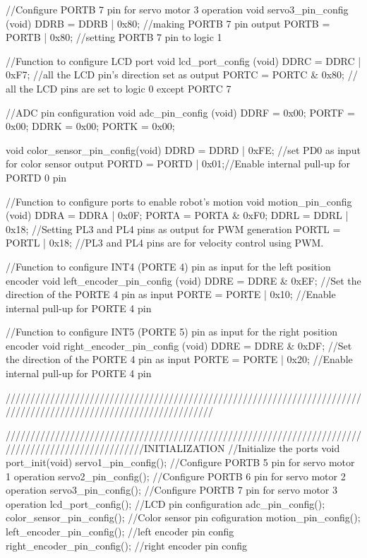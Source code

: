 //Configure PORTB 7 pin for servo motor 3 operation
void servo3_pin_config (void)
{
	DDRB  = DDRB | 0x80;  //making PORTB 7 pin output
	PORTB = PORTB | 0x80; //setting PORTB 7 pin to logic 1
}

//Function to configure LCD port
void lcd_port_config (void)
{
	DDRC = DDRC | 0xF7; //all the LCD pin's direction set as output
	PORTC = PORTC & 0x80; // all the LCD pins are set to logic 0 except PORTC 7
}

//ADC pin configuration
void adc_pin_config (void)
{
	DDRF = 0x00;
	PORTF = 0x00;
	DDRK = 0x00;
	PORTK = 0x00;
}

void color_sensor_pin_config(void)
{
	DDRD  = DDRD | 0xFE; //set PD0 as input for color sensor output
	PORTD = PORTD | 0x01;//Enable internal pull-up for PORTD 0 pin
}

//Function to configure ports to enable robot's motion
void motion_pin_config (void)
{
	DDRA = DDRA | 0x0F;
	PORTA = PORTA & 0xF0;
	DDRL = DDRL | 0x18;   //Setting PL3 and PL4 pins as output for PWM generation
	PORTL = PORTL | 0x18; //PL3 and PL4 pins are for velocity control using PWM.
}

//Function to configure INT4 (PORTE 4) pin as input for the left position encoder
void left_encoder_pin_config (void)
{
	DDRE  = DDRE & 0xEF;  //Set the direction of the PORTE 4 pin as input
	PORTE = PORTE | 0x10; //Enable internal pull-up for PORTE 4 pin
}

//Function to configure INT5 (PORTE 5) pin as input for the right position encoder
void right_encoder_pin_config (void)
{
	DDRE  = DDRE & 0xDF;  //Set the direction of the PORTE 4 pin as input
	PORTE = PORTE | 0x20; //Enable internal pull-up for PORTE 4 pin
}

//////////////////////////////////////////////////////////////////////////////////////////////////////////////////

////////////////////////////////////////////////////////////////////////////////////////////////////INITIALIZATION
//Initialize the ports
void port_init(void)
{
	servo1_pin_config();        //Configure PORTB 5 pin for servo motor 1 operation
	servo2_pin_config();        //Configure PORTB 6 pin for servo motor 2 operation
	servo3_pin_config();        //Configure PORTB 7 pin for servo motor 3 operation
	lcd_port_config();          //LCD pin configuration
	adc_pin_config();
	color_sensor_pin_config();  //Color sensor pin cofiguration
	motion_pin_config();
	left_encoder_pin_config(); //left encoder pin config
	right_encoder_pin_config(); //right encoder pin config
}

